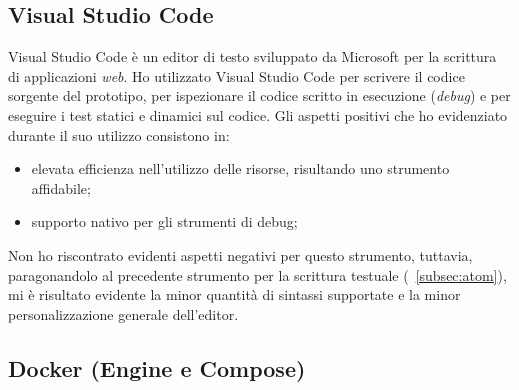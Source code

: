 \subsection{Visual Studio Code}

Visual Studio Code è un editor di testo sviluppato da Microsoft per la scrittura di applicazioni \emph{web}.
Ho utilizzato Visual Studio Code per scrivere il codice sorgente del prototipo, per ispezionare il codice scritto in esecuzione (\emph{debug}) e per eseguire i test statici e dinamici sul codice.
Gli aspetti positivi che ho evidenziato durante il suo utilizzo consistono in:
\begin{itemize}
	\item elevata efficienza nell'utilizzo delle risorse, risultando uno strumento affidabile;
	\item supporto nativo per gli strumenti di debug;
\end{itemize}
Non ho riscontrato evidenti aspetti negativi per questo strumento, tuttavia, paragonandolo al precedente strumento per la scrittura testuale (~\ref{subsec:atom}), mi è risultato evidente la minor quantità di sintassi supportate e la minor personalizzazione generale dell'editor.

\subsection{Docker (Engine e Compose)}


